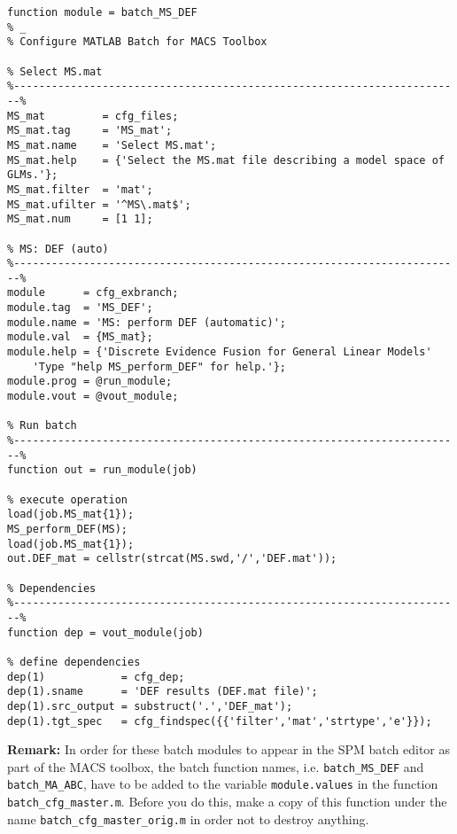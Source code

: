 \documentclass[a4paper,12pt]{article}
\begin{document}
\vspace{1em}
\begin{verbatim}
function module = batch_MS_DEF
% _
% Configure MATLAB Batch for MACS Toolbox

% Select MS.mat
%-----------------------------------------------------------------------%
MS_mat         = cfg_files;
MS_mat.tag     = 'MS_mat';
MS_mat.name    = 'Select MS.mat';
MS_mat.help    = {'Select the MS.mat file describing a model space of GLMs.'};
MS_mat.filter  = 'mat';
MS_mat.ufilter = '^MS\.mat$';
MS_mat.num     = [1 1];

% MS: DEF (auto)
%-----------------------------------------------------------------------%
module      = cfg_exbranch;
module.tag  = 'MS_DEF';
module.name = 'MS: perform DEF (automatic)';
module.val  = {MS_mat};
module.help = {'Discrete Evidence Fusion for General Linear Models'
	'Type "help MS_perform_DEF" for help.'};
module.prog = @run_module;
module.vout = @vout_module;

% Run batch
%-----------------------------------------------------------------------%
function out = run_module(job)

% execute operation
load(job.MS_mat{1});
MS_perform_DEF(MS);
load(job.MS_mat{1});
out.DEF_mat = cellstr(strcat(MS.swd,'/','DEF.mat'));

% Dependencies
%-----------------------------------------------------------------------%
function dep = vout_module(job)

% define dependencies
dep(1)            = cfg_dep;
dep(1).sname      = 'DEF results (DEF.mat file)';
dep(1).src_output = substruct('.','DEF_mat');
dep(1).tgt_spec   = cfg_findspec({{'filter','mat','strtype','e'}});
\end{verbatim}


\pagebreak
\textbf{Remark:} In order for these batch modules to appear in the SPM batch editor as part of the MACS toolbox, the batch function names, i.e. \texttt{batch\_MS\_DEF} and \texttt{batch\_MA\_ABC}, have to be added to the variable \texttt{module.values} in the function \texttt{batch\_cfg\_master.m}. Before you do this, make a copy of this function under the name \texttt{batch\_cfg\_master\_orig.m} in order not to destroy anything.
\end{document}
